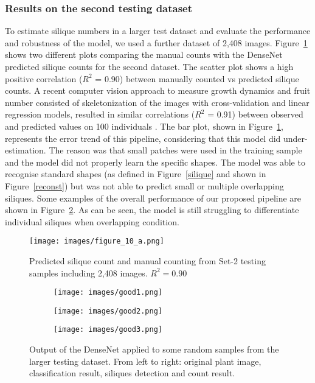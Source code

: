 \documentclass[a4paper,num-refs]{oup-contemporary}
\begin{document}
\subsubsection{Results on the second testing dataset}\label{part2}
To estimate silique numbers in a larger test dataset and evaluate the performance and robustness of the model, we used a further dataset of 2,408 images. 
Figure~\ref{large} shows two different plots comparing the  manual counts with the DenseNet predicted silique counts for the second dataset. The scatter plot shows a high positive correlation ($R^2$ = 0.90) between manually counted vs predicted silique counts. A recent computer vision approach to measure growth dynamics and fruit number consisted of skeletonization of the images with cross-validation and linear regression models,  resulted in similar correlations ($R^2$ = 0.91) between observed and predicted values on 100 individuals  \cite{vasseur2018image}. The bar plot, shown in Figure~\ref{large}, represents the error trend of this pipeline, considering that this model did under-estimation. The reason was that small patches were used in the training sample and the model did  not properly learn the specific shapes. The model was able to recognise standard shapes (as defined in Figure~\ref{silique} and shown in Figure~\ref{reconst}) but was not able to predict small or multiple overlapping siliques. Some examples of the overall performance of our proposed pipeline are shown in Figure~\ref{finalperformance}. As can be seen, the model is still struggling to differentiate individual siliques when overlapping condition. 
\begin{figure}[!ht]
	\centering
		\texttt{[image: images/figure\_10\_a.png]}
\caption{Predicted silique count and manual counting from Set-2 testing samples including 2,408 images. $R^2 = 0.90$}
	\label{large}
\end{figure}
\begin{figure}[!ht]
	\centering
	\begin{subfigure}[]{.5\textwidth}
		\texttt{[image: images/good1.png]}
	\end{subfigure}
	\begin{subfigure}[]{.5\textwidth}
		\texttt{[image: images/good2.png]}
	\end{subfigure}	
	\begin{subfigure}[]{.5\textwidth}
		\texttt{[image: images/good3.png]}
	\end{subfigure}	
\caption{Output of the DenseNet   applied to some random samples from the larger testing dataset. From left to right: original plant image, classification result, siliques detection and count result.}
	\label{finalperformance}
\end{figure}
\end{document}
